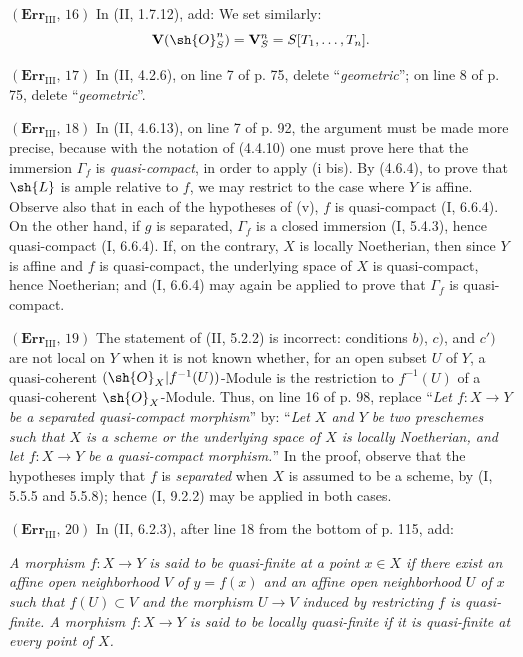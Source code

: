 \noindent\textbf{$(\mathbf{Err}_{\mathrm{III}},\,16)$} In (II, 1.7.12), add:
We set similarly:
\[
  \mathbf V(\sh{O}_S^n)=\mathbf V_S^n=S[T_1,\ldots,T_n].
\]

\noindent\textbf{$(\mathbf{Err}_{\mathrm{III}},\,17)$} In (II, 4.2.6), on
line 7 of p. 75, delete ``\emph{geometric}''; on line 8 of p. 75, delete
``\emph{geometric}''.

\noindent\textbf{$(\mathbf{Err}_{\mathrm{III}},\,18)$} In (II, 4.6.13), on
line 7 of p. 92, the argument must be made more precise, because with the
notation of (4.4.10) one must prove here that the immersion $\Gamma_f$ is
\emph{quasi-compact}, in order to apply (i bis). By (4.6.4), to prove that
$\sh{L}$ is ample relative to $f$, we may restrict to the case where $Y$ is
affine. Observe also that in each of the hypotheses of (v), $f$ is
quasi-compact (I, 6.6.4). On the other hand, if $g$ is
separated, $\Gamma_f$ is a closed immersion (I, 5.4.3), hence quasi-compact
(I, 6.6.4). If, on the contrary, $X$ is locally Noetherian, then since $Y$ is
affine and $f$ is quasi-compact, the underlying space of $X$ is quasi-compact,
hence Noetherian; and (I, 6.6.4) may again be applied to prove that $\Gamma_f$
is quasi-compact.

\noindent\textbf{$(\mathbf{Err}_{\mathrm{III}},\,19)$} The statement of (II,
5.2.2) is incorrect: conditions $b)$, $c)$, and $c')$ are not local on $Y$
when it is not known whether, for an open subset $U$ of $Y$, a quasi-coherent
$(\sh{O}_X|f^{-1}(U))$-Module is the restriction to $f^{-1}(U)$ of a
quasi-coherent $\sh{O}_X$-Module. Thus, on line 16 of p. 98, replace
``\emph{Let $f:X\to Y$ be a separated quasi-compact morphism}'' by:
``\emph{Let $X$ and $Y$ be two preschemes such that $X$ is a scheme or the
underlying space of $X$ is locally Noetherian, and let $f:X\to Y$ be a
quasi-compact morphism.}'' In the proof, observe that the hypotheses imply
that $f$ is \emph{separated} when $X$ is assumed to be a scheme, by (I, 5.5.5
and 5.5.8); hence (I, 9.2.2) may be applied in both cases.

\noindent\textbf{$(\mathbf{Err}_{\mathrm{III}},\,20)$} In (II, 6.2.3), after
line 18 from the bottom of p. 115, add:

\emph{A morphism $f:X\to Y$ is said to be quasi-finite at a point $x\in X$ if
there exist an affine open neighborhood $V$ of $y=f(x)$ and an affine open
neighborhood $U$ of $x$ such that $f(U)\subset V$ and the morphism $U\to V$
induced by restricting $f$ is quasi-finite. A morphism $f:X\to Y$ is said to
be locally quasi-finite if it is quasi-finite at every point of $X$.}


